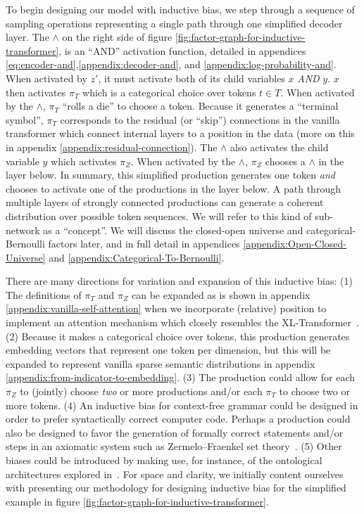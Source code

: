 \documentclass{article}
\begin{document}
To begin designing our model with inductive bias, we step through a sequence of sampling operations representing a single path through one simplified decoder layer.  The $\land$ on the right side of figure \ref{fig:factor-graph-for-inductive-transformer}, is an ``AND'' activation function, detailed in appendices \ref{eq:encoder-and},\ref{appendix:decoder-and}, and \ref{appendix:log-probability-and}. When activated by $z'$, it must activate both of its child variables $x$ \emph{AND} $y$. $x$ then activates $\pi_T$ which is a categorical choice over tokens $t \in T$. When activated by the $\land$, $\pi_T$ ``rolls a die'' to choose a token.  Because it generates a ``terminal symbol'', $\pi_T$ corresponds to the residual (or ``skip'') connections in the vanilla transformer which connect internal layers to a position in the data (more on this in appendix \ref{appendix:residual-connection}). The $\land$ also activates the child variable $y$ which activates $\pi_Z$. When activated by the $\land$, $\pi_Z$ chooses a $\land$ in the layer below.  In summary, this simplified production generates one token \emph{and} chooses to activate one of the productions in the layer below.  A path through multiple layers of strongly connected productions can generate a coherent distribution over possible token sequences.  We will refer to this kind of sub-network as a ``concept''.  We will discuss the closed-open universe and categorical-Bernoulli factors later, and in full detail in appendices \ref{appendix:Open-Closed-Universe} and \ref{appendix:Categorical-To-Bernoulli}.

There are many directions for variation and expansion of this inductive bias: (1) The definitions of $\pi_T$ and $\pi_Z$ can be expanded as is shown in appendix \ref{appendix:vanilla-self-attention} when we incorporate (relative) position to implement an attention mechanism which closely resembles the XL-Transformer~\cite{dai2019transformerxl}.  (2) Because it makes a categorical choice over tokens, this production generates embedding vectors that represent one token per dimension, but this will be expanded to represent vanilla sparse semantic distributions in appendix \ref{appendix:from-indicator-to-embedding}.  (3) The production could allow for each $\pi_Z$ to (jointly) choose \emph{two} or more productions and/or each $\pi_T$ to choose two or more tokens. (4) An inductive bias for context-free grammar could be designed in order to prefer syntactically correct computer code.  Perhaps a production could also be designed to favor the generation of formally correct statements and/or steps in an axiomatic system such as Zermelo–Fraenkel set theory~\citep{hrbacek2017introduction}. (5) Other biases could be introduced by making use, for instance, of the ontological architectures explored in~\cite{gruber1993translation, gruber1995toward}. For space and clarity, we initially content ourselves with presenting our methodology for designing inductive bias for the simplified example in figure \ref{fig:factor-graph-for-inductive-transformer}.
\end{document}
